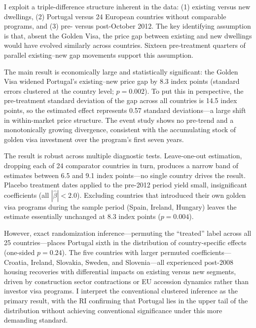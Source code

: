 \documentclass[12pt]{article}
\begin{document}
I exploit a triple-difference structure inherent in the data: (1) existing versus new dwellings, (2) Portugal versus 24 European countries without comparable programs, and (3) pre- versus post-October 2012. The key identifying assumption is that, absent the Golden Visa, the price gap between existing and new dwellings would have evolved similarly across countries. Sixteen pre-treatment quarters of parallel existing--new gap movements support this assumption.

The main result is economically large and statistically significant: the Golden Visa widened Portugal's existing--new price gap by 8.3 index points (standard errors clustered at the country level; $p = 0.002$). To put this in perspective, the pre-treatment standard deviation of the gap across all countries is 14.5 index points, so the estimated effect represents 0.57 standard deviations---a large shift in within-market price structure. The event study shows no pre-trend and a monotonically growing divergence, consistent with the accumulating stock of golden visa investment over the program's first seven years.

The result is robust across multiple diagnostic tests. Leave-one-out estimation, dropping each of 24 comparator countries in turn, produces a narrow band of estimates between 6.5 and 9.1 index points---no single country drives the result. Placebo treatment dates applied to the pre-2012 period yield small, insignificant coefficients (all $|\hat{\beta}| < 2.0$). Excluding countries that introduced their own golden visa programs during the sample period (Spain, Ireland, Hungary) leaves the estimate essentially unchanged at 8.3 index points ($p = 0.004$).

However, exact randomization inference---permuting the ``treated'' label across all 25 countries---places Portugal sixth in the distribution of country-specific effects (one-sided $p = 0.24$). The five countries with larger permuted coefficients---Croatia, Ireland, Slovakia, Sweden, and Slovenia---all experienced post-2008 housing recoveries with differential impacts on existing versus new segments, driven by construction sector contractions or EU accession dynamics rather than investor visa programs. I interpret the conventional clustered inference as the primary result, with the RI confirming that Portugal lies in the upper tail of the distribution without achieving conventional significance under this more demanding standard.
\end{document}
